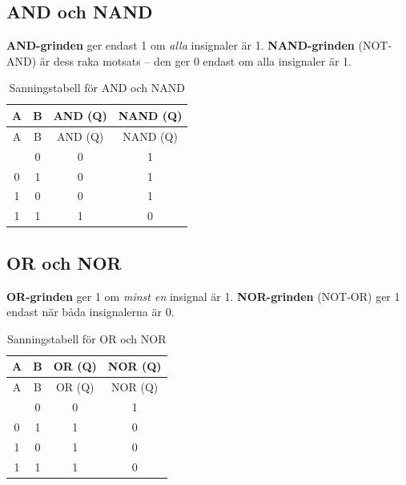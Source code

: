 \documentclass[
  swedish,
  letterpaper,
  oneside,
  openany]{book}
\begin{document}
\subsection{AND och NAND}\label{and-och-nand}

\textbf{AND-grinden} ger endast 1 om \emph{alla} insignaler är 1.
\textbf{NAND-grinden} (NOT-AND) är dess raka motsats -- den ger 0 endast
om alla insignaler är 1.

\begin{longtable}[]{@{}cccc@{}}
\caption{Sanningstabell för AND och
NAND}\label{tbl-and-nand}\tabularnewline
\toprule\noalign{}
A & B & AND (Q) & NAND (Q) \\
\midrule\noalign{}
\endfirsthead
\toprule\noalign{}
A & B & AND (Q) & NAND (Q) \\
\midrule\noalign{}
\endhead
\bottomrule\noalign{}
\endlastfoot
0 & 0 & 0 & 1 \\
0 & 1 & 0 & 1 \\
1 & 0 & 0 & 1 \\
1 & 1 & 1 & 0 \\
\end{longtable}

\subsection{OR och NOR}\label{or-och-nor}

\textbf{OR-grinden} ger 1 om \emph{minst en} insignal är 1.
\textbf{NOR-grinden} (NOT-OR) ger 1 endast när båda insignalerna är 0.

\begin{longtable}[]{@{}cccc@{}}
\caption{Sanningstabell för OR och NOR}\label{tbl-or-nor}\tabularnewline
\toprule\noalign{}
A & B & OR (Q) & NOR (Q) \\
\midrule\noalign{}
\endfirsthead
\toprule\noalign{}
A & B & OR (Q) & NOR (Q) \\
\midrule\noalign{}
\endhead
\bottomrule\noalign{}
\endlastfoot
0 & 0 & 0 & 1 \\
0 & 1 & 1 & 0 \\
1 & 0 & 1 & 0 \\
1 & 1 & 1 & 0 \\
\end{longtable}
\end{document}
